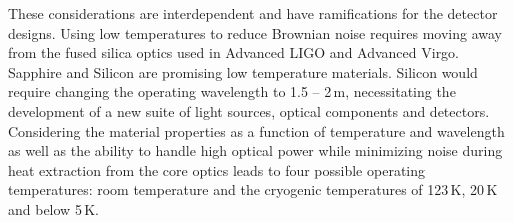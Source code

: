 These considerations are interdependent and have ramifications for the detector designs. Using low temperatures to reduce Brownian noise requires moving away from the fused silica optics used in Advanced LIGO and Advanced Virgo. Sapphire and Silicon are promising low temperature materials. Silicon would require changing the operating wavelength to 1.5 -- 2\,\micro m, necessitating the development of a new suite of light sources, optical components and detectors. Considering the material properties as a function of temperature and wavelength as well as the ability to handle high optical power while minimizing noise during heat extraction from the core optics leads to four possible operating temperatures:
room temperature and the cryogenic temperatures of 123\,K, 20\,K and below 5\,K.


